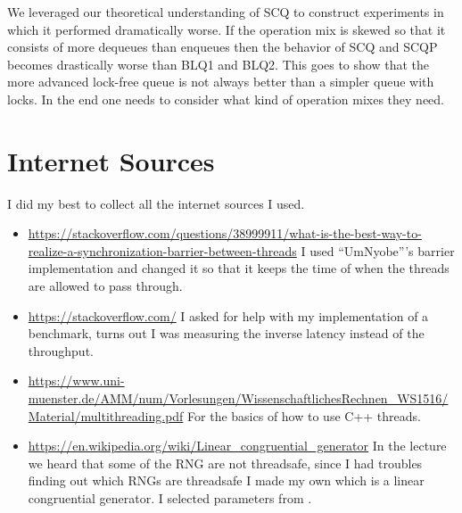 \documentclass{article}      %
\begin{document}
We leveraged our theoretical understanding of SCQ to construct experiments in which it performed dramatically worse. If the operation mix is skewed so that it consists of more dequeues than enqueues then the behavior of SCQ and SCQP becomes drastically worse than BLQ1 and BLQ2. This goes to show that the more advanced lock-free queue is not always better than a simpler queue with locks. In the end one needs to consider what kind of operation mixes they need.


\pagebreak





\section*{Internet Sources}
I did my best to collect all the internet sources I used.
\begin{itemize}
	\item \url{https://stackoverflow.com/questions/38999911/what-is-the-best-way-to-realize-a-synchronization-barrier-between-threads} I used ``UmNyobe'''s barrier implementation and changed it so that it keeps the time of when the threads are allowed to pass through.
	\item \url{https://stackoverflow.com/} I asked for help with my implementation of a benchmark, turns out I was measuring the inverse latency instead of the throughput.
	\item \url{https://www.uni-muenster.de/AMM/num/Vorlesungen/WissenschaftlichesRechnen_WS1516/Material/multithreading.pdf} For the basics of how to use C++ threads.
	\item 
	\url{https://en.wikipedia.org/wiki/Linear_congruential_generator} In the lecture we heard that some of the RNG are not threadsafe, since I had troubles finding out which RNGs are threadsafe I made my own which is a linear congruential generator. I selected parameters from \cite{LinCongrGen}.
\end{itemize}
\end{document}
